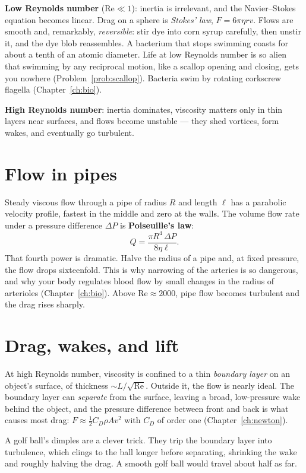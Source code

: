 \textbf{Low Reynolds number} ($\mathrm{Re}\ll1$): inertia is irrelevant, and the Navier--Stokes equation becomes linear. Drag on a sphere is \emph{Stokes' law}, $F = 6\pi\eta rv$. Flows are smooth and, remarkably, \emph{reversible}: stir dye into corn syrup carefully, then unstir it, and the dye blob reassembles. A bacterium that stops swimming coasts for about a tenth of an atomic diameter. Life at low Reynolds number is so alien that swimming by any reciprocal motion, like a scallop opening and closing, gets you nowhere (Problem~\ref{prob:scallop}). Bacteria swim by rotating corkscrew flagella (Chapter~\ref{ch:bio}).

\textbf{High Reynolds number}: inertia dominates, viscosity matters only in thin layers near surfaces, and flows become unstable --- they shed vortices, form wakes, and eventually go turbulent.

\section{Flow in pipes}

Steady viscous flow through a pipe of radius $R$ and length $\ell$ has a parabolic velocity profile, fastest in the middle and zero at the walls. The volume flow rate under a pressure difference $\Delta P$ is \textbf{Poiseuille's law}:
\[
  Q = \frac{\pi R^4\,\Delta P}{8\eta\ell} .
\]
That fourth power is dramatic. Halve the radius of a pipe and, at fixed pressure, the flow drops sixteenfold. This is why narrowing of the arteries is so dangerous, and why your body regulates blood flow by small changes in the radius of arterioles (Chapter~\ref{ch:bio}). Above $\mathrm{Re}\approx2000$, pipe flow becomes turbulent and the drag rises sharply.

\section{Drag, wakes, and lift}
\label{sec:lift}

At high Reynolds number, viscosity is confined to a thin \emph{boundary layer} on an object's surface, of thickness $\sim L/\sqrt{\mathrm{Re}}$. Outside it, the flow is nearly ideal. The boundary layer can \emph{separate} from the surface, leaving a broad, low-pressure wake behind the object, and the pressure difference between front and back is what causes most drag: $F\approx\tfrac12C_D\rho Av^2$ with $C_D$ of order one (Chapter~\ref{ch:newton}).

A golf ball's dimples are a clever trick. They trip the boundary layer into turbulence, which clings to the ball longer before separating, shrinking the wake and roughly halving the drag. A smooth golf ball would travel about half as far.

